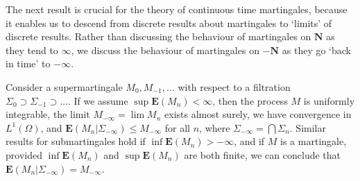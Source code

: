 The next result is crucial for the theory of continuous time martingales, because it enables us to descend from discrete results about martingales to `limits' of discrete results. Rather than discussing the behaviour of martingales on $\mathbf{N}$ as they tend to $\infty$, we discuss the behaviour of martingales on $-\mathbf{N}$ as they go `back in time' to $-\infty$.

\begin{theorem}
    Consider a supermartingale $M_0, M_{-1}, \dots$ with respect to a filtration $\Sigma_0 \supset \Sigma_{-1} \supset \dots$. If we assume $\sup \mathbf{E}(M_n) < \infty$, then the process $M$ is uniformly integrable, the limit $M_{-\infty} = \lim M_n$ exists almost surely, we have convergence in $L^1(\Omega)$, and $\mathbf{E}(M_n|\Sigma_{-\infty}) \leq M_{-\infty}$ for all $n$, where $\Sigma_{-\infty} = \bigcap \Sigma_n$. Similar results for submartingales hold if $\inf \mathbf{E}(M_n) > -\infty$, and if $M$ is a martingale, provided $\inf \mathbf{E}(M_n)$ and $\sup \mathbf{E}(M_n)$ are both finite, we can conclude that $\mathbf{E}(M_n|\Sigma_{-\infty}) = M_{-\infty}$.
\end{theorem}
